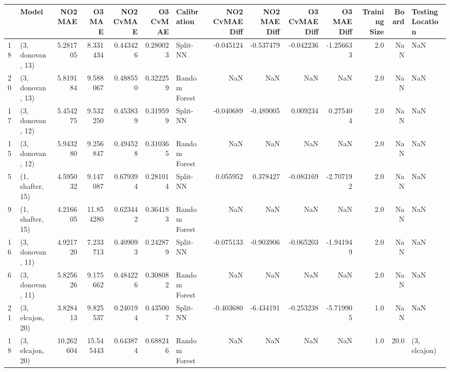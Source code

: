 \begin{tabular}{llrrrrlrrrrrrl}
\toprule
{} &             Model &    NO2 MAE &     O3 MAE &  NO2 CvMAE &  O3 CvMAE &    Calibration &  NO2 CvMAE Diff &  NO2 MAE Diff &  O3 CvMAE Diff &  O3 MAE Diff &  Training Size &  Board & Testing Location \\
\midrule
18 &  (3, donovan, 13) &   5.281705 &   8.331434 &   0.443426 &  0.280023 &       Split-NN &       -0.045124 &     -0.537479 &      -0.042236 &    -1.256633 &            2.0 &    NaN &              NaN \\
20 &  (3, donovan, 13) &   5.819184 &   9.588067 &   0.488550 &  0.322259 &  Random Forest &             NaN &           NaN &            NaN &          NaN &            2.0 &    NaN &              NaN \\
17 &  (3, donovan, 12) &   5.454275 &   9.532250 &   0.453839 &  0.319599 &       Split-NN &       -0.040689 &     -0.489005 &       0.009234 &     0.275404 &            2.0 &    NaN &              NaN \\
15 &  (3, donovan, 12) &   5.943280 &   9.256847 &   0.494528 &  0.310365 &  Random Forest &             NaN &           NaN &            NaN &          NaN &            2.0 &    NaN &              NaN \\
5  &  (1, shafter, 15) &   4.595032 &   9.147087 &   0.679394 &  0.281014 &       Split-NN &        0.055952 &      0.378427 &      -0.083169 &    -2.707192 &            2.0 &    NaN &              NaN \\
9  &  (1, shafter, 15) &   4.216605 &  11.854280 &   0.623442 &  0.364183 &  Random Forest &             NaN &           NaN &            NaN &          NaN &            2.0 &    NaN &              NaN \\
16 &  (3, donovan, 11) &   4.921720 &   7.233713 &   0.409093 &  0.242879 &       Split-NN &       -0.075133 &     -0.903906 &      -0.065203 &    -1.941949 &            2.0 &    NaN &              NaN \\
6  &  (3, donovan, 11) &   5.825626 &   9.175662 &   0.484226 &  0.308082 &  Random Forest &             NaN &           NaN &            NaN &          NaN &            2.0 &    NaN &              NaN \\
21 &  (3, elcajon, 20) &   3.828413 &   9.825537 &   0.240194 &  0.435007 &       Split-NN &       -0.403680 &     -6.434191 &      -0.253238 &    -5.719905 &            1.0 &    NaN &              NaN \\
18 &  (3, elcajon, 20) &  10.262604 &  15.545443 &   0.643874 &  0.688246 &  Random Forest &             NaN &           NaN &            NaN &          NaN &            1.0 &   20.0 &     (3, elcajon) \\

\end{tabular}

